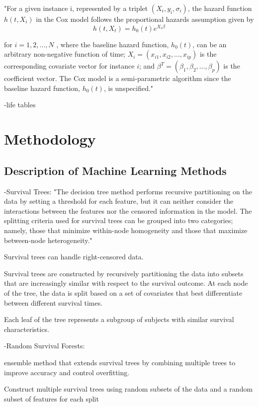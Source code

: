 \documentclass{article}
\begin{document}
"For a given instance i, represented by a triplet $(X_i , y_i, \sigma_i )$, the hazard function $h(t, X_i)$ in the Cox model follows the proportional hazards assumption given by
\begin{equation*}
    h(t, X_t) = h_0(t)e^{X_t\beta}
\end{equation*}

for $i = 1, 2, \dots, N$ , where the baseline hazard function, $h_0(t)$, can be an arbitrary non-negative function of time; $X_i = (x_{i1}, x_{i2}, \dots , x_{ip})$ is the corresponding covariate vector for instance $i$; and $\beta^T = (\beta_1, \beta_2, \dots , \beta_p)$ is the coefficient vector. The Cox model is a semi-parametric algorithm since the baseline hazard function, $h_0(t)$, is unspecified."

-life tables


\section{Methodology}
\subsection{Description of Machine Learning Methods}
-Survival Trees:
"The decision tree method performs recursive partitioning on the data by setting a threshold for each feature, but it can neither consider the interactions between the features nor the censored information in the model\cite{SafavianLandgrebe}. The splitting criteria used for survival trees can be grouped into two categories; namely, those that minimize within-node homogeneity and those that maximize between-node heterogeneity."\cite{WangEtAl}

Survival trees can handle right-censored data. 

Survival trees are constructed by recursively partitioning the data into subsets that are increasingly similar with respect to the survival outcome. At each node of the tree, the data is split based on a set of covariates that best differentiate between different survival times.

Each leaf of the tree represents a subgroup of subjects with similar survival characteristics.

-Random Survival Forests:

 ensemble method that extends survival trees by combining multiple trees to improve accuracy and control overfitting.

Construct multiple survival trees using random subsets of the data and a random subset of features for each split
 
\end{document}
